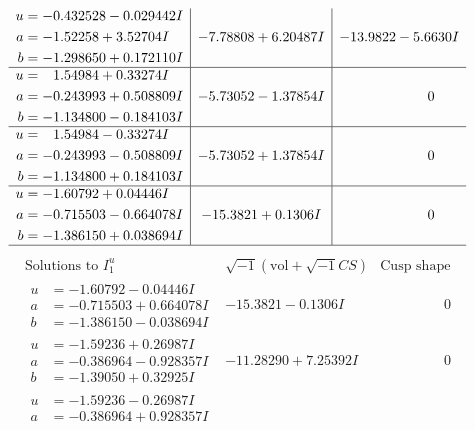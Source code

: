 \documentclass[1p]{elsarticle_modified}
\theoremstyle{definition}
\newcommand{\I}{\sqrt{-1}}
\begin{document}
$$\begin{array}{c|c|c}
\begin{aligned}
u &= -0.432528 - 0.029442 I \\
a &= -1.52258 + 3.52704 I \\
b &= -1.298650 + 0.172110 I\end{aligned}
 & -7.78808 + 6.20487 I & -13.9822 - 5.6630 I \\ \hline\begin{aligned}
u &= \phantom{-}1.54984 + 0.33274 I \\
a &= -0.243993 + 0.508809 I \\
b &= -1.134800 - 0.184103 I\end{aligned}
 & -5.73052 - 1.37854 I & \phantom{-0.000000 } 0 \\ \hline\begin{aligned}
u &= \phantom{-}1.54984 - 0.33274 I \\
a &= -0.243993 - 0.508809 I \\
b &= -1.134800 + 0.184103 I\end{aligned}
 & -5.73052 + 1.37854 I & \phantom{-0.000000 } 0 \\ \hline\begin{aligned}
u &= -1.60792 + 0.04446 I \\
a &= -0.715503 - 0.664078 I \\
b &= -1.386150 + 0.038694 I\end{aligned}
 & -15.3821 + 0.1306 I & \phantom{-0.000000 } 0\\
 \hline 
 \end{array}$$\newpage$$\begin{array}{c|c|c}  
\text{Solutions to }I^u_{1}& \I (\text{vol} + \sqrt{-1}CS) & \text{Cusp shape}\\
 \hline 
\begin{aligned}
u &= -1.60792 - 0.04446 I \\
a &= -0.715503 + 0.664078 I \\
b &= -1.386150 - 0.038694 I\end{aligned}
 & -15.3821 - 0.1306 I & \phantom{-0.000000 } 0 \\ \hline\begin{aligned}
u &= -1.59236 + 0.26987 I \\
a &= -0.386964 - 0.928357 I \\
b &= -1.39050 + 0.32925 I\end{aligned}
 & -11.28290 + 7.25392 I & \phantom{-0.000000 } 0 \\ \hline\begin{aligned}
u &= -1.59236 - 0.26987 I \\
a &= -0.386964 + 0.928357 I \\

\end{aligned}
\end{array}$$
\end{document}
